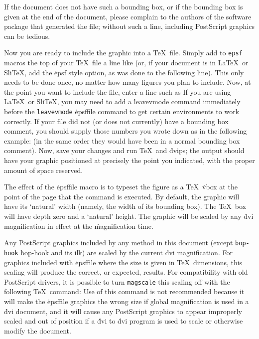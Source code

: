 If the document does not have such a bounding box, or if the bounding box
is given at the end of the document, please complain to the authors of the
software package that generated the file; without such a line, including
PostScript graphics can be tedious.


Now you are ready to include the graphic into a \TeX\ file.  Simply add to
\^{{\tt epsf} macros}
the top of your \TeX\ file a line like
\noindent
(or, if your document is in La\TeX\ or Sli\TeX, add the \.{epsf} style
option, as was done to the following line).
\noindent
This only needs to be done once, no matter how many figures you plan to
include.  Now, at the point you want to include the file, enter a line
such as
\noindent
If you are using La\TeX\ or Sli\TeX, you may need to add a
\.{leavevmode} command immediately before the
\^{{\tt leavevmode}}
\.{epsffile} command to get certain environments to work
correctly.  If your file did not (or does not currently) have a bounding
box comment, you should supply those numbers you wrote down as in the
following example:
\noindent
(in the same order they would have been in a normal bounding box comment).
Now, save your changes and run \TeX\ and \.{dvips}; the output should
have your graphic positioned at precisely the point you indicated, with the
proper amount of space reserved.

The effect of the \.{epsffile} macro is to typeset the figure as a \TeX\
\.{vbox} at the point of the page that the command is executed.
By default, the graphic will have its
`natural' width (namely, the width of its bounding box).
The \TeX\ box will have depth zero and a `natural' height.
The graphic will be scaled by any \.{dvi} magnification in effect at the
\^{magnification}
time.

Any PostScript graphics included by any method in this document (except
\^{{\tt bop-hook}}
\.{bop-hook} and its ilk) are scaled by the current \.{dvi} magnification.
For graphics included with \.{epsffile} where the size is given in \TeX\
dimensions, this scaling will produce the correct, or expected, results.
For compatibility with old PostScript drivers, it is possible to turn
\^{{\tt magscale}}
this scaling off with the following \TeX\ command:
\noindent
Use of this command is not recommended because it will make the
\.{epsffile} graphics the wrong size if global magnification is used
in a \.{dvi} document, and it will cause any PostScript graphics to
appear improperly scaled and out of position if a \.{dvi} to \.{dvi}
program is used to scale or otherwise modify the document.

